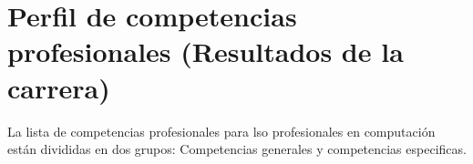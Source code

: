 \section{Perfil de competencias profesionales (Resultados de la carrera)}\label{sec:outcomes}
La lista de competencias profesionales para lso profesionales en computación están divididas en dos grupos: Competencias generales y competencias especificas.




% 
